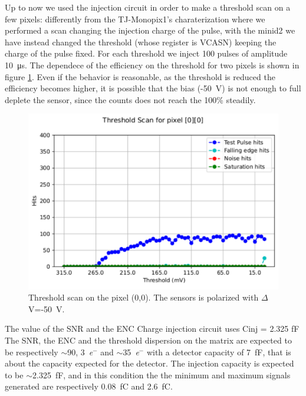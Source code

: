     Up to now we used the injection circuit in order to make a threshold scan on a few pixels: differently from the TJ-Monopix1's charaterization where we performed a scan changing the injection charge of the pulse, with the minid2 we have instead changed the threshold (whose register is VCASN) keeping the charge of the pulse fixed.
    For each threshold we inject 100 pulses of amplitude \SI{10}{\us}. The dependece of the efficiency on the threshold for two pixels is shown in figure \ref{fig:ARCADIA_threshold}.  
    Even if the behavior is reasonable, as the threshold is reduced the efficiency becomes higher, it is possible that the bias (-\SI{50}{V}) is not enough to full deplete the sensor, since the counts does not reach the 100\% steadily. 
    \begin{figure}[h!]
        \centering
        \includegraphics[width=.7\linewidth]{figures/charaterization/ARCADIA/threshold_0_0.pdf}
        \caption{Threshold scan on the pixel (0,0). The sensors is polarized with $\Delta$V=-\SI{50}{V}. }
        \label{fig:ARCADIA_threshold}
    \end{figure} 

    The value of the SNR and the ENC 
    Charge injection circuit uses Cinj = 2.325 fF
    The SNR, the ENC and the threshold dispersion on the matrix are expected to be respectively $\sim$90, \SI{3}{\elementarycharge}$^-$ and $\sim$\SI{35}{\elementarycharge}$^-$ with a detector capacity of \SI{7}{fF}, that is about the capacity expected for the detector. 
    The injection capacity is expected to be $\sim$\SI{2.325}{fF}, and in this condition the the minimum and maximum signals generated are respectively \SI{0.08}{fC} and \SI{2.6}{fC}.


